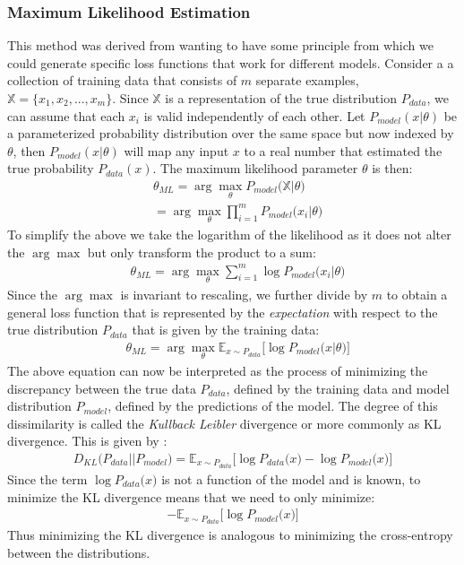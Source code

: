 \documentclass[14pt]{extarticle}
\numberwithin{equation}{section}
\begin{document}
	\subsubsection{Maximum Likelihood Estimation}
	This method was derived from wanting to have some principle from which we could generate specific loss functions that work for different models. Consider a a collection of training data that consists of $m$ separate examples, $\mathbb{X} = \{x_1, x_2, ..., x_m\}$. Since $\mathbb{X}$ is a representation of the true distribution $P_{data}$, we can assume that each $x_i$ is valid independently of each other. Let $P_{model}(x|\theta)$ be a parameterized probability distribution over the same space but now indexed by $\theta$, then $P_{model}(x|\theta)$ will map any input $x$ to a real number that estimated the true probability $P_{data}(x)$. The maximum likelihood parameter $\theta$ is then:
	\begin{align}
	&\theta_{ML} = \arg\max_{\theta}P_{model}\big(\mathbb{X}|\theta\big)\nonumber\\
	& = \arg\max_{\theta}\prod_{i=1}^{m}P_{model}\big(x_i|\theta\big)
	\end{align}		
	To simplify the above we take the logarithm of the likelihood as it does not alter the $\arg\max$ but only transform the product to a sum:
	\begin{align}
	& \theta_{ML}=\arg\max_{\theta}\sum_{i=1}^{m}\log P_{model}\big(x_i|\theta\big)
	\end{align}
	Since the $\arg\max$ is invariant to rescaling, we further divide by $m$ to obtain a general loss function that is represented by the \textit{expectation} with respect to the true distribution $P_{data}$ that is given by the training data:
	\begin{align}
	& \theta_{ML} = \arg\max_{\theta}\mathbb{E}_{x\sim P_{data}}\big[\log P_{model}\big(x|\theta\big)\big]
	\end{align}
	The above equation can now be interpreted as the process of minimizing the discrepancy between the true data $P_{data}$, defined by the training data and model distribution $P_{model}$, defined by the predictions of the model. The degree of this dissimilarity is called the \textit{Kullback Leibler} divergence or more commonly as KL divergence. This is given by :
	\begin{align}
	D_{KL}\big(P_{data}||P_{model} \big) = \mathbb{E}_{x\sim P_{data}}\big[\log P_{data}\big(x\big) - \log P_{model}\big(x\big)\big]
	\end{align}
	Since the term $\log P_{data}\big(x\big)$ is not a function of the model and is known, to minimize the KL divergence means that we need to only minimize:
	\begin{align}
	- \mathbb{E}_{x \sim P_{data}}\big[\log P_{model}\big(x\big)\big]
	\end{align}
	Thus minimizing the KL divergence is analogous to minimizing the cross-entropy between the distributions.
\end{document}
